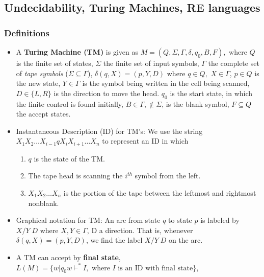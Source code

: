 \subsection{\color{ForestGreen}Undecidability, Turing Machines, RE languages}
\subsubsection{Definitions}
\begin{itemize}
    \item A \textbf{Turing Machine (TM)} is given as $M = (Q, \Sigma, \Gamma, \delta, q_0, B, F), $ where $Q$ is the finite set of states, $\Sigma$ the finite set of input symbols, $\Gamma$ the complete set of \textit{tape symbols} ($\Sigma \subseteq \Gamma$), $\delta(q, X) = (p, Y, D)$ where $q \in Q,$ $X \in \Gamma$, $p\in Q$ is the new state, $Y\in\Gamma$ is the symbol being written in the cell being scanned, $D \in \{L, R\}$ is the direction to move the head. $q_0$ is the start state, in which the finite control is found initially, $B\in \Gamma, \notin \Sigma$, is the blank symbol, $F\subseteq Q$ the accept states. 
    \item Instantaneous Description (ID) for TM's: We use the string $X_1 X_2 \hdots X_{i-1} q  X_i X_{i+1} \hdots X_n $ to represent an ID in which 
    \begin{enumerate}
        \item $q$ is the state of the TM. 
        \item The tape head is scanning the $i^{th}$ symbol from the left. 
        \item $X_1X_2\hdots X_n$ is the portion of the tape between the leftmost and rightmost nonblank.
    \end{enumerate}
    \item Graphical notation for TM: An arc from state $q$ to state $p$ is labeled by $X/Y\;  D$ where $X,Y\in \Gamma$, D
a direction. That is, whenever $\delta (q ,X) = ( p ,Y ,D)$, we find the
label $X/Y\;  D$ on the arc.
    \item A TM can accept by \textbf{final state}, $L(M) = \{w | q_0 w \vdash ^* I, \text{ where $I$ is an ID with final state} \} $,
    

\end{itemize}
